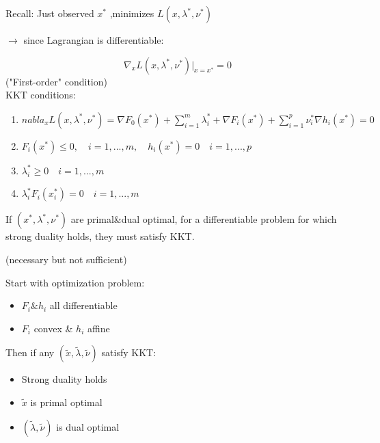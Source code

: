 Recall: Just observed $x^*$ ,minimizes $L(x,\lambda^*,\nu^*)$

$\rightarrow$ since Lagrangian is differentiable:

\begin{equation*}
\nabla_x L(x,\lambda^*,\nu^*) {\vert}_{x=x^*} = 0
\end{equation*}
("First-order" condition)\\


KKT conditions:

\begin{enumerate}
	\item $nabla_x L(x,\lambda^*,\nu^*) = \nabla F_0(x^*)+\sum^m_{i=1}\lambda^*_i+\nabla F_i(x^*)+\sum^p_{i=1}\nu_i^*\nabla h_i(x^*)=0$
	
	\item $F_i(x^*) \leq 0,\quad i=1,...,m,\quad h_i(x^*)=0\quad i=1,...,p$
	
	\item $\lambda_i^*\geq 0\quad i=1,...,m$
	
	\item $\lambda_i^*F_i(x_i^*)= 0\quad i=1,...,m$
\end{enumerate}

\begin{theorem}{}
	If $(x^*,\lambda^*,\nu^*)$ are primal\&dual optimal, for a differentiable problem for which strong duality holds, they must satisfy KKT.
\end{theorem}
(necessary but not sufficient)

\begin{theorem}
	Start with optimization problem:
	\begin{itemize}
		\item $F_i\&h_i$ all differentiable
		
		\item $F_i$ convex \& $h_i$ affine
	\end{itemize}
	
	Then if any $(\tilde{x},\tilde{\lambda},\tilde{\nu})$ satisfy KKT:
	
	\begin{itemize}
		\item Strong duality holds
		
		\item $\tilde{x}$ is primal optimal
		
		\item $(\tilde{\lambda},\tilde{\nu})$ is dual optimal
	\end{itemize}
\end{theorem}

